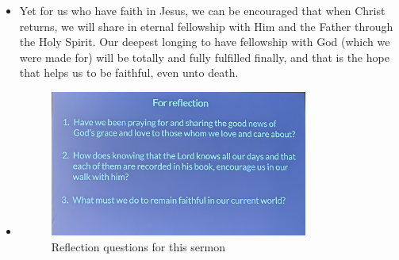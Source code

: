 \begin{itemize}
{  emotional torment described is just a way for us to scratch the surface of
  the depth of this torment.}
  \item{Yet for us who have faith in Jesus, we can be encouraged that when
  Christ returns, we will share in eternal fellowship with Him and the Father
  through the Holy Spirit.  Our deepest longing to have fellowship with God
  (which we were made for) will be totally and fully fulfilled finally, and
  that is the hope that helps us to be faithful, even unto death.  }
  \item{\begin{figure}[H]
    \centering
    \includegraphics[width=0.8\textwidth, trim={0cm 0cm 0cm 0cm},clip]{Figures/aprilSermon5Reflections.jpg}
    \caption[]{Reflection questions for this sermon}
  \end{figure}}
\end{itemize}